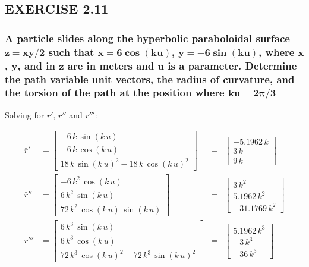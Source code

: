 \documentclass[12pt, letterpaper]{../assignment}
\begin{document}
\subsection*{EXERCISE 2.11}
\subsubsection*{A particle slides along the hyperbolic paraboloidal surface $\bm{z = xy/2}$ such that $\bm{x = 6\cos(ku)}$,
$\bm{y = -6\sin(ku)}$, where $\bm{x}$, $\bm{y}$, and in $\bm{z}$ are in meters and $\bm{u}$ is a parameter.
Determine the path variable unit vectors,
the radius of curvature,
and the torsion of the path at the position where $\bm{ku = 2\pi/3}$}

Solving for $r'$, $r''$ and $r'''$:

\begin{equation*}
\begin{aligned}
\bar{r}' &= \left[\begin{array}{c} -6\,k\,\sin\left(k\,u\right)\\ -6\,k\,\cos\left(k\,u\right)\\ 18\,k\,{\sin\left(k\,u\right)}^2-18\,k\,{\cos\left(k\,u\right)}^2 \end{array}\right]
&= &\left[\begin{array}{c} -5.1962\,k\\ 3\,k\\ 9\,k \end{array}\right]\\
\bar{r}'' &= \left[\begin{array}{c} -6\,k^2\,\cos\left(k\,u\right)\\ 6\,k^2\,\sin\left(k\,u\right)\\ 72\,k^2\,\cos\left(k\,u\right)\,\sin\left(k\,u\right) \end{array}\right]
&= &\left[\begin{array}{c} 3\,k^2\\ 5.1962\,k^2\\ -31.1769\,k^2 \end{array}\right] \\
\bar{r}''' &= \left[\begin{array}{c} 6\,k^3\,\sin\left(k\,u\right)\\ 6\,k^3\,\cos\left(k\,u\right)\\ 72\,k^3\,{\cos\left(k\,u\right)}^2-72\,k^3\,{\sin\left(k\,u\right)}^2 \end{array}\right]
&= &\left[\begin{array}{c} 5.1962\,k^3\\ -3\,k^3\\ -36\,k^3 \end{array}\right]\\
\end{aligned}
\end{equation*}
\end{document}
